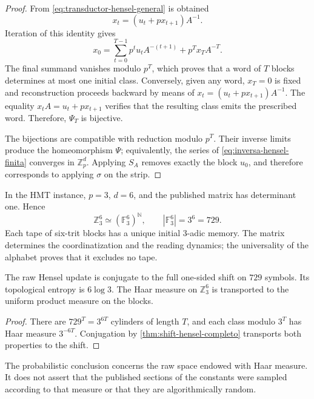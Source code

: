 \begin{proof}
From \cref{eq:transductor-hensel-general} is obtained
\[
 x_t=(u_t+px_{t+1})A^{-1}.
\]
Iteration of this identity gives
\[
 x_0=
 \sum_{t=0}^{T-1}p^t u_tA^{-(t+1)}
 +p^Tx_TA^{-T}.
\]
The final summand vanishes modulo \(p^T\), which proves that a word of
\(T\) blocks determines at most one initial class. Conversely, given
any word, \(x_T=0\) is fixed and reconstruction proceeds backward by means of
\(x_t=(u_t+px_{t+1})A^{-1}\). The equality
\(x_tA=u_t+px_{t+1}\) verifies that the resulting class emits the prescribed
word. Therefore, \(\Psi_T\) is bijective.

The bijections are compatible with reduction modulo \(p^T\). Their inverse
limits produce the homeomorphism \(\Psi\); equivalently, the series of
\cref{eq:inversa-hensel-finita} converges in \(\mathbb Z_p^d\). Applying
\(S_A\) removes exactly the block \(u_0\), and therefore corresponds to
applying \(\sigma\) on the strip.
\end{proof}

In the HMT instance, \(p=3\), \(d=6\), and the published matrix has
determinant one. Hence
\begin{equation}
 \mathbb Z_3^6\simeq(\mathbb F_3^6)^{\mathbb N},
 \qquad |\mathbb F_3^6|=3^6=729.
 \label{eq:hmt-shift-729}
\end{equation}
Each tape of six-trit blocks has a unique initial 3-adic memory.
The matrix determines the coordinatization and the reading dynamics; the
universality of the alphabet proves that it excludes no tape.

\begin{corollary}
The raw Hensel update is conjugate to the full one-sided shift on
\(729\) symbols. Its topological entropy is \(6\log3\). The Haar measure on
\(\mathbb Z_3^6\) is transported to the uniform product measure on the
blocks.
\end{corollary}

\begin{proof}
There are \(729^T=3^{6T}\) cylinders of length \(T\), and each class modulo
\(3^T\) has Haar measure \(3^{-6T}\). Conjugation by
\cref{thm:shift-hensel-completo} transports both properties to the
shift.
\end{proof}

The probabilistic conclusion concerns the raw space endowed with Haar measure. It
does not assert that the published sections of the constants were sampled
according to that measure or that they are algorithmically random.

